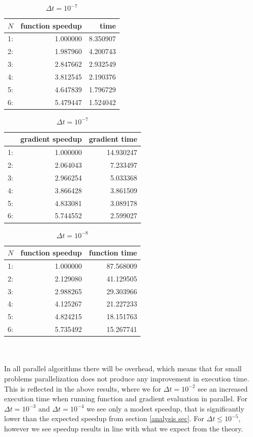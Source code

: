 \begin{table}[!h]
\centering
\caption{$\Delta t=10^{-7}$}
\begin{tabular}{lrr}
\toprule
{}$N$ &  function speedup &      time \\
\midrule
1: &  1.000000 &  8.350907 \\
2: &  1.987960 &  4.200743 \\
3: &  2.847662 &  2.932549 \\
4: &  3.812545 &  2.190376 \\
5: &  4.647839 &  1.796729 \\
6: &  5.479447 &  1.524042 \\
\bottomrule
\end{tabular}
\begin{tabular}{lrr}
\toprule
{} &  gradient speedup &     gradient  time \\
\midrule
1: &  1.000000 &  14.930247 \\
2: &  2.064043 &   7.233497 \\
3: &  2.966254 &   5.033368 \\
4: &  3.866428 &   3.861509 \\
5: &  4.833081 &   3.089178 \\
6: &  5.744552 &   2.599027 \\
\bottomrule
\end{tabular}
\end{table}
\begin{table}[!h]
\centering
\caption{$\Delta t=10^{-8}$}
\begin{tabular}{lrr}
\toprule
{} $N$&  function speedup &      function time \\
\midrule
1: &  1.000000 &  87.568009 \\
2: &  2.129080 &  41.129505 \\
3: &  2.988265 &  29.303966 \\
4: &  4.125267 &  21.227233 \\
5: &  4.824215 &  18.151763 \\
6: &  5.735492 &  15.267741 \\
\bottomrule
\end{tabular}
\end{table}
\\
\\
In all parallel algorithms there will be overhead, which means that for small problems parallelization does not produce any improvement in execution time. This is reflected in the above results, where we for $\Delta t = 10^{-2}$ see an increased execution time when running function and gradient evaluation in parallel. For $\Delta t = 10^{-3}$ and $\Delta t = 10^{-4}$ we see only a modest speedup, that is significantly lower than the expected speedup from section \ref{analysis sec}. For $\Delta t \leq 10^{-5}$, however we see speedup results in line with what we expect from the theory.  
